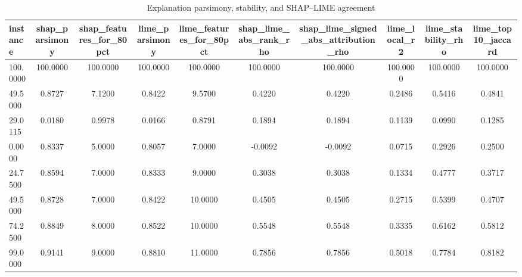 \begin{table}
\centering
\caption{Explanation parsimony, stability, and SHAP--LIME agreement}
\label{tab:explanation_quality}
\begin{tabular}{lccccccccc}
\toprule
instance & shap_parsimony & shap_features_for_80pct & lime_parsimony & lime_features_for_80pct & shap_lime_abs_rank_rho & shap_lime_signed_abs_attribution_rho & lime_local_r2 & lime_stability_rho & lime_top10_jaccard \\
\midrule
100.0000 & 100.0000 & 100.0000 & 100.0000 & 100.0000 & 100.0000 & 100.0000 & 100.0000 & 100.0000 & 100.0000 \\
49.5000 & 0.8727 & 7.1200 & 0.8422 & 9.5700 & 0.4220 & 0.4220 & 0.2486 & 0.5416 & 0.4841 \\
29.0115 & 0.0180 & 0.9978 & 0.0166 & 0.8791 & 0.1894 & 0.1894 & 0.1139 & 0.0990 & 0.1285 \\
0.0000 & 0.8337 & 5.0000 & 0.8057 & 7.0000 & -0.0092 & -0.0092 & 0.0715 & 0.2926 & 0.2500 \\
24.7500 & 0.8594 & 7.0000 & 0.8333 & 9.0000 & 0.3038 & 0.3038 & 0.1334 & 0.4777 & 0.3717 \\
49.5000 & 0.8728 & 7.0000 & 0.8422 & 10.0000 & 0.4505 & 0.4505 & 0.2715 & 0.5399 & 0.4707 \\
74.2500 & 0.8849 & 8.0000 & 0.8522 & 10.0000 & 0.5548 & 0.5548 & 0.3335 & 0.6162 & 0.5812 \\
99.0000 & 0.9141 & 9.0000 & 0.8810 & 11.0000 & 0.7856 & 0.7856 & 0.5018 & 0.7784 & 0.8182 \\
\bottomrule
\end{tabular}
\end{table}
